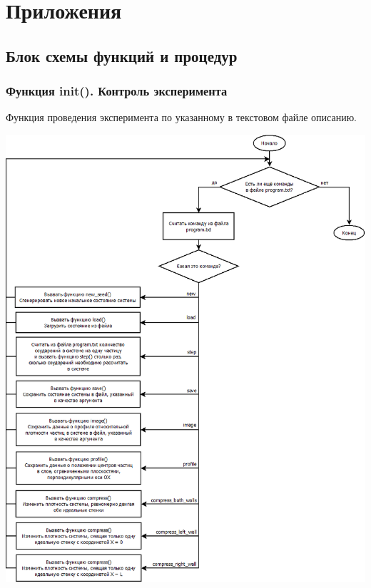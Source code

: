 \documentclass[a4paper]{article}
\begin{document}
\newpage




\newpage
\section{Приложения}

\subsection{Блок схемы функций и процедур}

\subsubsection{Функция init(). Контроль эксперимента }

Функция проведения эксперимента по указанному в
текстовом файле описанию.


\begin{center}
\includegraphics[scale=0.45]{init.png}
\end{center}
\end{document}
